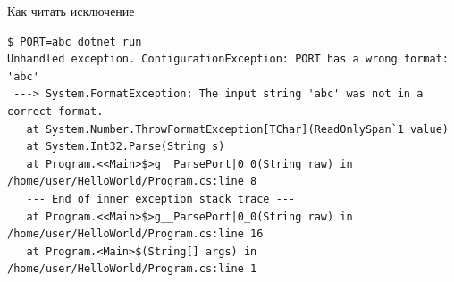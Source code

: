 \documentclass[aspectratio=169,10pt,t]{beamer}
\begin{document}
\begin{frame}[fragile]{Как читать исключение}
  \slidetop
\begin{lstlisting}[style=term,basicstyle=\ttfamily\fontsize{6.9}{8.2}\selectfont]
$ PORT=abc dotnet run
Unhandled exception. ConfigurationException: PORT has a wrong format: 'abc'
 ---> System.FormatException: The input string 'abc' was not in a correct format.
   at System.Number.ThrowFormatException[TChar](ReadOnlySpan`1 value)
   at System.Int32.Parse(String s)
   at Program.<<Main>$>g__ParsePort|0_0(String raw) in /home/user/HelloWorld/Program.cs:line 8
   --- End of inner exception stack trace ---
   at Program.<<Main>$>g__ParsePort|0_0(String raw) in /home/user/HelloWorld/Program.cs:line 16
   at Program.<Main>$(String[] args) in /home/user/HelloWorld/Program.cs:line 1
\end{lstlisting}

  \slidegap
\end{frame}

\begin{frame}[plain]
\end{frame}
\end{document}
